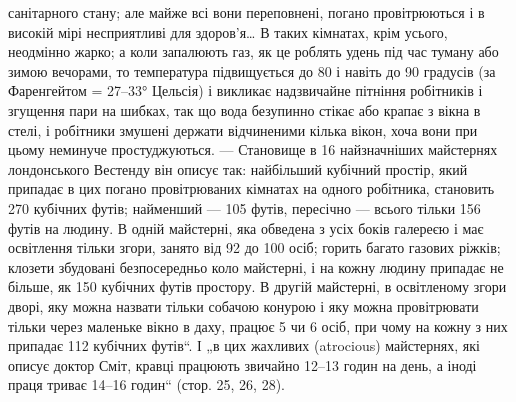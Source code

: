 \parcont{}  %
санітарного стану; але майже всі вони переповнені, погано провітрюються і в високій мірі
несприятливі для здоров’я\dots{} В таких
кімнатах, крім усього, неодмінно жарко; а коли запалюють газ,
як це роблять удень під час туману або зимою вечорами, то температура підвищується до 80 і навіть до
90 градусів (за Фаренгейтом = 27--33° Цельсія) і викликає надзвичайне пітніння робітників
і згущення пари на шибках, так що вода безупинно стікає або
крапає з вікна в стелі, і робітники змушені держати відчиненими
кілька вікон, хоча вони при цьому неминуче простуджуються. —
Становище в 16 найзначніших майстернях лондонського Вестенду
він описує так: найбільший кубічний простір, який припадає
в цих погано провітрюваних кімнатах на одного робітника, становить 270 кубічних футів; найменший —
105 футів, пересічно —
всього тільки 156 футів на людину. В одній майстерні, яка обведена з усіх боків галереєю і має
освітлення тільки згори,
занято від 92 до 100 осіб; горить багато газових ріжків; клозети
збудовані безпосередньо коло майстерні, і на кожну людину
припадає не більше, як 150 кубічних футів простору. В другій
майстерні, в освітленому згори дворі, яку можна назвати тільки
собачою конурою і яку можна провітрювати тільки через маленьке вікно в даху, працює 5 чи 6 осіб, при
чому на кожну
з них припадає 112 кубічних футів“. І „в цих жахливих (atrocious) майстернях, які описує доктор
Сміт, кравці працюють
звичайно 12--13 годин на день, а іноді праця триває 14--16 годин“ (стор. 25, 26, 28).

